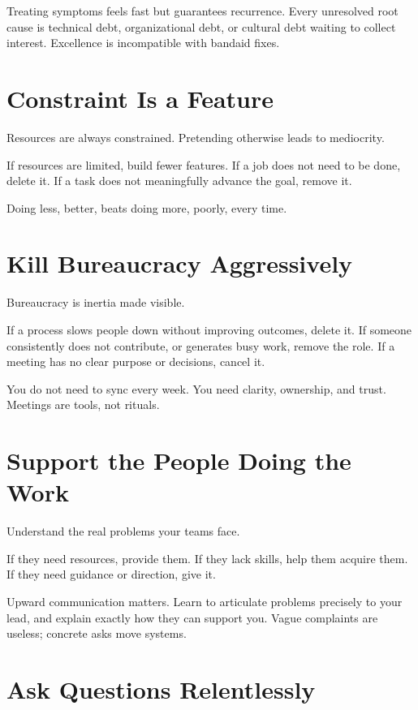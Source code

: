 Treating symptoms feels fast but guarantees recurrence. Every unresolved
root cause is technical debt, organizational debt, or cultural debt
waiting to collect interest. Excellence is incompatible with bandaid
fixes.

\section{Constraint Is a Feature}\label{constraint-is-a-feature}

Resources are always constrained. Pretending otherwise leads to
mediocrity.

If resources are limited, build fewer features. If a job does not need
to be done, delete it. If a task does not meaningfully advance the goal,
remove it.

Doing less, better, beats doing more, poorly, every time.

\section{Kill Bureaucracy
Aggressively}\label{kill-bureaucracy-aggressively}

Bureaucracy is inertia made visible.

If a process slows people down without improving outcomes, delete it. If
someone consistently does not contribute, or generates busy work, remove
the role. If a meeting has no clear purpose or decisions, cancel it.

You do not need to sync every week. You need clarity, ownership, and
trust. Meetings are tools, not rituals.

\section{Support the People Doing the
Work}\label{support-the-people-doing-the-work}

Understand the real problems your teams face.

If they need resources, provide them. If they lack skills, help them
acquire them. If they need guidance or direction, give it.

Upward communication matters. Learn to articulate problems precisely to
your lead, and explain exactly how they can support you. Vague
complaints are useless; concrete asks move systems.

\section{Ask Questions Relentlessly}\label{ask-questions-relentlessly}

